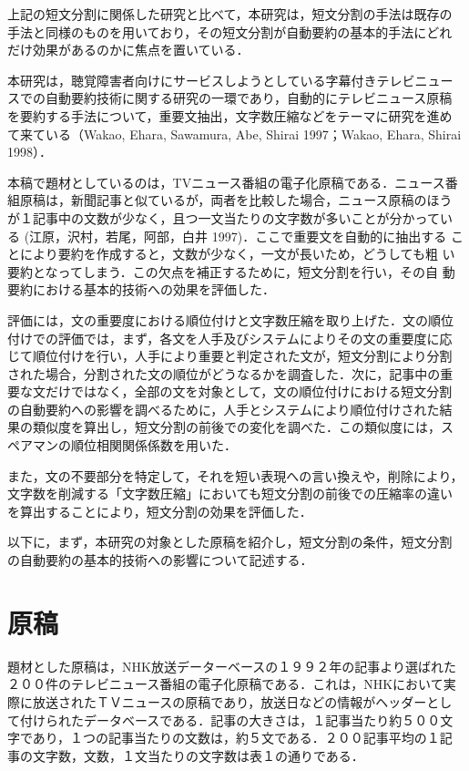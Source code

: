 上記の短文分割に関係した研究と比べて，本研究は，短文分割の手法は既存の
手法と同様のものを用いており，その短文分割が自動要約の基本的手法にどれ
だけ効果があるのかに焦点を置いている．

本研究は，聴覚障害者向けにサービスしようとしている字幕付きテレビニュー
スでの自動要約技術に関する研究の一環であり，自動的にテレビニュース原稿
を要約する手法について，重要文抽出，文字数圧縮などをテーマに研究を進め
て来ている（Wakao, Ehara, Sawamura, Abe, Shirai 1997；Wakao, Ehara,
Shirai 1998）．

本稿で題材としているのは，TVニュース番組の電子化原稿である．ニュース番
組原稿は，新聞記事と似ているが，両者を比較した場合，ニュース原稿のほう
が１記事中の文数が少なく，且つ一文当たりの文字数が多いことが分かってい
る (江原，沢村，若尾，阿部，白井 1997)．ここで重要文を自動的に抽出する
ことにより要約を作成すると，文数が少なく，一文が長いため，どうしても粗
い要約となってしまう．この欠点を補正するために，短文分割を行い，その自
動要約における基本的技術への効果を評価した．

評価には，文の重要度における順位付けと文字数圧縮を取り上げた．文の順位
付けでの評価では，まず，各文を人手及びシステムによりその文の重要度に応
じて順位付けを行い，人手により重要と判定された文が，短文分割により分割
された場合，分割された文の順位がどうなるかを調査した．次に，記事中の重
要な文だけではなく，全部の文を対象として，文の順位付けにおける短文分割
の自動要約への影響を調べるために，人手とシステムにより順位付けされた結
果の類似度を算出し，短文分割の前後での変化を調べた．この類似度には，ス
ペアマンの順位相関関係係数を用いた．

また，文の不要部分を特定して，それを短い表現への言い換えや，削除により，
文字数を削減する「文字数圧縮」においても短文分割の前後での圧縮率の違い
を算出することにより，短文分割の効果を評価した．

以下に，まず，本研究の対象とした原稿を紹介し，短文分割の条件，短文分割
の自動要約の基本的技術への影響について記述する．

\section{原稿}
題材とした原稿は，NHK放送データーベースの１９９２年の記事より選ばれた
２００件のテレビニュース番組の電子化原稿である．これは，NHKにおいて実
際に放送されたＴＶニュースの原稿であり，放送日などの情報がヘッダーとし
て付けられたデータベースである．記事の大きさは，１記事当たり約５００文
字であり，１つの記事当たりの文数は，約５文である．２００記事平均の１記
事の文字数，文数，１文当たりの文字数は表１の通りである．

